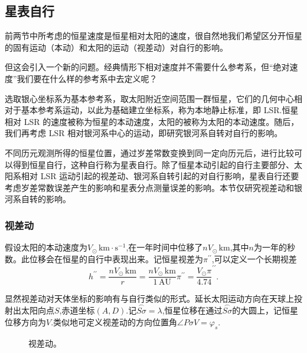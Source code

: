 \documentclass[11pt, a4paper, oneside]{ctexart}
\numberwithin{equation}{subsection}
\begin{document}
\subsection{星表自行}
前两节中所考虑的恒星速度是恒星相对太阳的速度，很自然地我们希望区分开恒星的固有运动（本动）和太阳的运动（视差动）对自行的影响。

但这会引入一个新的问题。经典情形下相对速度并不需要什么参考系，但“绝对速度”我们要在什么样的参考系中去定义呢？

选取银心坐标系为基本参考系，取太阳附近空间范围一群恒星，它们的几何中心相对于基本参考系运动，以此为基础建立坐标系，称为本地静止标准，即 LSR.恒星相对 LSR 的速度被称为恒星的本动速度，太阳的被称为太阳的本动速度。随后，我们再考虑 LSR 相对银河系中心的运动，即研究银河系自转对自行的影响。

不同历元观测所得的恒星位置，通过岁差常数变换到同一定向历元后，进行比较可以得到恒星自行，这种自行称为星表自行。除了恒星本动引起的自行主要部分、太阳系相对 LSR 运动引起的视差动、银河系自转引起的对自行影响，星表自行还要考虑岁差常数误差产生的影响和星表分点测量误差的影响。本节仅研究视差动和银河系自转的影响。

\subsubsection{视差动}
假设太阳的本动速度为$V_\odot\,\mathrm{km\cdot{}s^{-1}}$,在一年时间中位移了$nV_\odot\,\mathrm{km}$,其中$n$为一年的秒数。此位移会在恒星的自行中表现出来。记恒星视差为$\pi^{\prime\prime}$,可以定义一个长期视差
\begin{equation}
h^{\prime\prime}=\frac{nV_{\odot}\,\mathrm{km}}{r}=\frac{nV_{\odot}\,\mathrm{km}}{1\,\mathrm{AU}}\pi^{\prime\prime}=\frac{V_{\odot}\pi}{4.74}^{\prime\prime}.
\end{equation}

显然视差动对天体坐标的影响有与自行类似的形式。延长太阳运动方向在天球上投射出太阳向点$S$,赤道坐标$\left(A,D\right)$.记$\overset{\frown}{S\sigma}=\lambda$,恒星位移在通过$\overset{\frown}{S\sigma}$的大圆上，记恒星位移方向为$V$.类似地可定义视差动的方向位置角$\angle{P\sigma V}=\varphi_{s}$.
\begin{figure}[!htp]
\centering
{}
\captionsetup{justification=raggedright, singlelinecheck=false}
\caption{视差动。}
\label{视差动。}
\end{figure}
\end{document}
